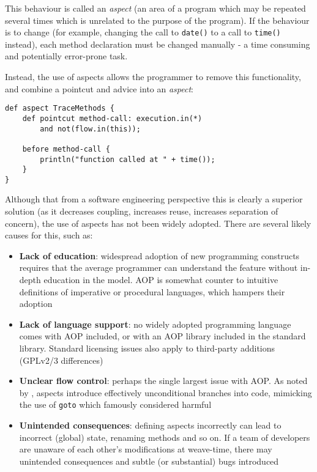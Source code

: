         This behaviour is called an \textit{aspect} (an area of a program which may be repeated several times which is unrelated to the purpose of the program). If the behaviour is to change (\eg for example, changing the call to \texttt{date()} to a call to \texttt{time()} instead), each method declaration must be changed manually - a time consuming and potentially error-prone task.

        Instead, the use of aspects allows the programmer to remove this functionality, and combine a pointcut and advice into an \textit{aspect}:

        \begin{lstlisting}[caption=AOP-based advice equivalent to listing \ref{lst:tradadvice},label=lst:aopadvice]
def aspect TraceMethods {
    def pointcut method-call: execution.in(*)
        and not(flow.in(this));

    before method-call {
        println("function called at " + time());
    }
}\end{lstlisting}

        Although that from a software engineering perspective this is clearly a superior solution (as it decreases coupling, increases reuse, increases separation of concern), the use of aspects has not been widely adopted. There are several likely causes for this, such as:

        \begin{itemize}
                \item \textbf{Lack of education}: widespread adoption of new programming constructs requires that the average programmer can understand the feature without in-depth education in the model. AOP is somewhat counter to intuitive definitions of imperative or procedural languages, which hampers their adoption
                
                \item \textbf{Lack of language support}: no widely adopted programming language comes with AOP included, or with an AOP library included in the standard library. Standard licensing issues also apply to third-party additions (\eg GPLv2/3 differences)
                
                \item \textbf{Unclear flow control}: perhaps the single largest issue with AOP. As noted by \citet{Constantinides2004}, aspects introduce effectively unconditional branches into code, mimicking the use of \texttt{goto} which \citeauthor{Dijkstra1968} famously considered harmful \citep{Dijkstra1968}
                
                \item \textbf{Unintended consequences}: defining aspects incorrectly can lead to incorrect (global) state, \eg renaming methods and so on. If a team of developers are unaware of each other's modifications at weave-time, there may unintended consequences and subtle (or substantial) bugs introduced
        \end{itemize}

